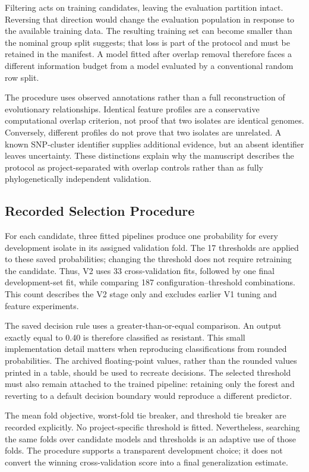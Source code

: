 \documentclass[conference]{IEEEtran}
\begin{document}
Filtering acts on training candidates, leaving the evaluation partition intact. Reversing that direction would change the evaluation population in response to the available training data. The resulting training set can become smaller than the nominal group split suggests; that loss is part of the protocol and must be retained in the manifest. A model fitted after overlap removal therefore faces a different information budget from a model evaluated by a conventional random row split.

The procedure uses observed annotations rather than a full reconstruction of evolutionary relationships. Identical feature profiles are a conservative computational overlap criterion, not proof that two isolates are identical genomes. Conversely, different profiles do not prove that two isolates are unrelated. A known SNP-cluster identifier supplies additional evidence, but an absent identifier leaves uncertainty. These distinctions explain why the manuscript describes the protocol as project-separated with overlap controls rather than as fully phylogenetically independent validation.

\subsection{Recorded Selection Procedure}
For each candidate, three fitted pipelines produce one probability for every development isolate in its assigned validation fold. The 17 thresholds are applied to these saved probabilities; changing the threshold does not require retraining the candidate. Thus, V2 uses 33 cross-validation fits, followed by one final development-set fit, while comparing 187 configuration--threshold combinations. This count describes the V2 stage only and excludes earlier V1 tuning and feature experiments.

The saved decision rule uses a greater-than-or-equal comparison. An output exactly equal to 0.40 is therefore classified as resistant. This small implementation detail matters when reproducing classifications from rounded probabilities. The archived floating-point values, rather than the rounded values printed in a table, should be used to recreate decisions. The selected threshold must also remain attached to the trained pipeline: retaining only the forest and reverting to a default decision boundary would reproduce a different predictor.

The mean fold objective, worst-fold tie breaker, and threshold tie breaker are recorded explicitly. No project-specific threshold is fitted. Nevertheless, searching the same folds over candidate models and thresholds is an adaptive use of those folds. The procedure supports a transparent development choice; it does not convert the winning cross-validation score into a final generalization estimate.
\end{document}
